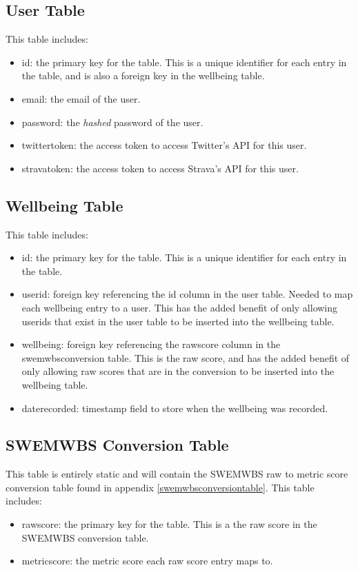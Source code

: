 \documentclass[11pt,openright,a4paper]{report}
\begin{document}
\subsection{User Table}
This table includes:
\begin{itemize}
\item id: the primary key for the table. This is a unique identifier for each entry in the table, and is also a foreign key in the wellbeing table.
\item email: the email of the user.
\item password: the \emph{hashed} password of the user.
\item twitter\textunderscore token: the access token to access Twitter's API for this user.
\item strava\textunderscore token: the access token to access Strava's API for this user.
\end{itemize}

\subsection{Wellbeing Table}
This table includes:
\begin{itemize}
\item id: the primary key for the table. This is a unique identifier for each entry in the table.
\item user\textunderscore id: foreign key referencing the id column in the user table. Needed to map each wellbeing entry to a user. This has the added benefit of only allowing user\textunderscore ids that exist in the user table to be inserted into the wellbeing table.
\item wellbeing: foreign key referencing the raw\textunderscore score column in the swemwbs\textunderscore conversion table. This is the raw score, and has the added benefit of only allowing raw scores that are in the conversion to be inserted into the wellbeing table.
\item date\textunderscore recorded: timestamp field to store when the wellbeing was recorded.
\end{itemize}

\subsection{SWEMWBS Conversion Table}
This table is entirely static and will contain the SWEMWBS raw to metric score conversion table found in appendix \ref{swemwbsconversiontable}. This table includes:
\begin{itemize}
\item raw\textunderscore score: the primary key for the table. This is a the raw score in the SWEMWBS conversion table.
\item metric\textunderscore score: the metric score each raw score entry maps to.
\end{itemize}
\end{document}
